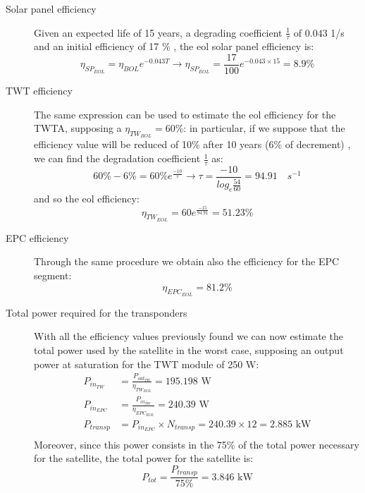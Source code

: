 \documentclass[11pt,a4paper,titlepage]{article}
\begin{document}
\begin{description}
	\item[Solar panel efficiency] Given an expected life of 15 years, a degrading coefficient $\frac{1}{\tau}$ of $0.043$ 1/s and an initial efficiency of 17 \% \cite{Miguel17}, the \gls{eol} solar panel efficiency is:
		\begin{equation}
			\eta_{SP_{EOL}} = \eta_{BOL}e^{-0.043T} \rightarrow \eta_{SP_{EOL}} = \frac{17}{100}e^{-0.043\times 15} = 8.9 \%
		\end{equation}
	\item[TWT efficiency] The same expression can be used to estimate the \gls{eol} efficiency for the TWTA, supposing a $\eta_{TW_{BOL}} = 60\%$: in particular, if we suppose that the efficiency value will be reduced of 10\% after 10 years (6\% of decrement) \cite{Miguel17}, we can find the degradation coefficient $\frac{1}{\tau}$ as:
		\begin{equation}
		60 \% - 6 \% =60 \% e^{\frac{-10}{\tau}} \rightarrow \tau = \frac{-10}{log_e\frac{54}{60}} = 94.91 \quad s^{-1}
		\end{equation}
		and so the \gls{eol} efficiency:
		\begin{equation}
		\eta_{TW_{EOL}} = 60e^{\frac{-15}{94.91}} = 51.23 \%
		\end{equation}
	\item[EPC efficiency] Through the same procedure we obtain also the efficiency for the EPC segment:
		\begin{equation}
		\eta_{EPC_{EOL}} = 81.2 \%
		\end{equation}
	\item[Total power required for the transponders] With all the efficiency values previously found we can now estimate the total power used by the satellite in the worst case, supposing an output power at saturation for the TWT module of 250 W:
		\begin{align}
		P_{in_{TW}} &= \frac{P_{out_{TW}}}{\eta_{TW_{EOL}}} = 195.198 \text{ W}\\
		P_{in_{EPC}} &= \frac{P_{in_{TW}}}{\eta_{EPC_{EOL}}} = 240.39 \text{ W}\\
		P_{transp} &= P_{in_{EPC}} \times N_{transp} = 240.39 \times 12 = 2.885 \text{ kW}\\
		\end{align}
		Moreover, since this power consists in the 75\% of the total power necessary for the satellite, the total power for the satellite is:
		\begin{equation}
		P_{tot} = \frac{P_{transp}}{75\%} = 3.846 \text{ kW}
		\end{equation}
\end{description}
\end{document}
